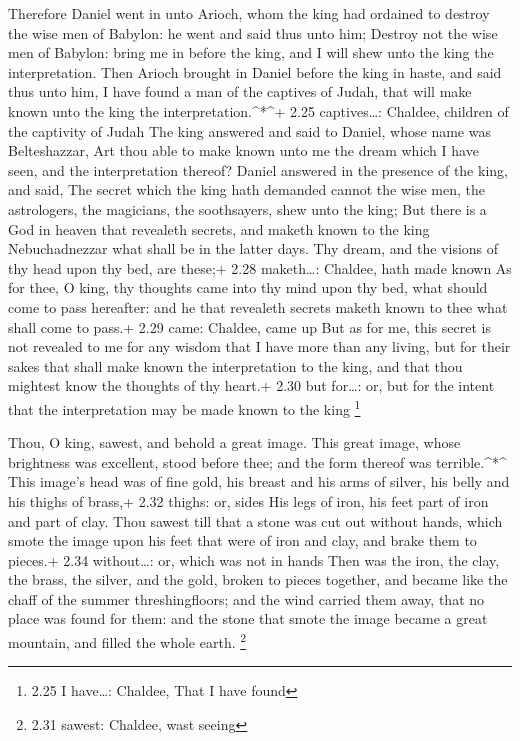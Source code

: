  Therefore Daniel went in unto Arioch, whom the king had
ordained to destroy the wise men of Babylon: he went and said thus unto
him; Destroy not the wise men of Babylon: bring me in before the king,
and I will shew unto the king the interpretation.  Then
Arioch brought in Daniel before the king in haste, and said thus unto
him, I have found a man of the captives of Judah, that will make known
unto the king the interpretation.\^{}*\^{}+ 2.25 captives\ldots:
Chaldee, children of the captivity of Judah  The king
answered and said to Daniel, whose name was Belteshazzar, Art thou able
to make known unto me the dream which I have seen, and the
interpretation thereof?  Daniel answered in the presence of
the king, and said, The secret which the king hath demanded cannot the
wise men, the astrologers, the magicians, the soothsayers, shew unto the
king;  But there is a God in heaven that revealeth secrets,
and maketh known to the king Nebuchadnezzar what shall be in the latter
days. Thy dream, and the visions of thy head upon thy bed, are these;+
2.28 maketh\ldots: Chaldee, hath made known  As for thee, O
king, thy thoughts came into thy mind upon thy bed, what should come to
pass hereafter: and he that revealeth secrets maketh known to thee what
shall come to pass.+ 2.29 came: Chaldee, came up  But as
for me, this secret is not revealed to me for any wisdom that I have
more than any living, but for their sakes that shall make known the
interpretation to the king, and that thou mightest know the thoughts of
thy heart.+ 2.30 but for\ldots: or, but for the intent that the
interpretation may be made known to the king \footnote{2.25 I
  have\ldots: Chaldee, That I have found}

 Thou, O king, sawest, and behold a great image. This great
image, whose brightness was excellent, stood before thee; and the form
thereof was terrible.\^{}*\^{}  This image's head was of
fine gold, his breast and his arms of silver, his belly and his thighs
of brass,+ 2.32 thighs: or, sides  His legs of iron, his
feet part of iron and part of clay.  Thou sawest till that
a stone was cut out without hands, which smote the image upon his feet
that were of iron and clay, and brake them to pieces.+ 2.34
without\ldots: or, which was not in hands  Then was the
iron, the clay, the brass, the silver, and the gold, broken to pieces
together, and became like the chaff of the summer threshingfloors; and
the wind carried them away, that no place was found for them: and the
stone that smote the image became a great mountain, and filled the whole
earth. \footnote{2.31 sawest: Chaldee, wast seeing}

